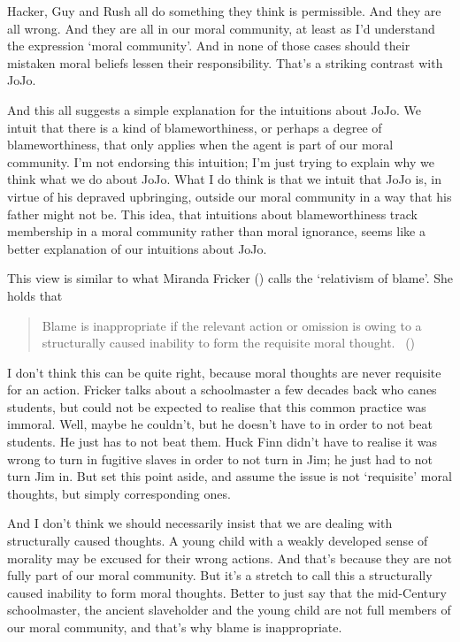 \documentclass[
  10pt,
  letterpaper,
  twoside]{scrbook}
\begin{document}
{Hacker}, {Guy} and {Rush} all do something they think is permissible.
And they are all wrong. And they are all in our moral community, at
least as I'd understand the expression `moral community'. And in none of
those cases should their mistaken moral beliefs lessen their
responsibility. That's a striking contrast with {JoJo}.

And this all suggests a simple explanation for the intuitions about
{JoJo}. We intuit that there is a kind of blameworthiness, or perhaps a
degree of blameworthiness, that only applies when the agent is part of
our moral community. I'm not endorsing this intuition; I'm just trying
to explain why we think what we do about {JoJo}. What I do think is that
we intuit that {JoJo} is, in virtue of his depraved upbringing, outside
our moral community in a way that his father might not be. This idea,
that intuitions about blameworthiness track membership in a moral
community rather than moral ignorance, seems like a better explanation
of our intuitions about {JoJo}.

This view is similar to what Miranda Fricker
() calls the `relativism of blame'.
She holds that

\begin{quote}
Blame is inappropriate if the relevant action or omission is owing to a
structurally caused inability to form the requisite moral thought.
~()
\end{quote}

I don't think this can be quite right, because moral thoughts are never
requisite for an action. Fricker talks about a schoolmaster a few
decades back who canes students, but could not be expected to realise
that this common practice was immoral. Well, maybe he couldn't, but he
doesn't have to in order to not beat students. He just has to not beat
them. {Huck} Finn didn't have to realise it was wrong to turn in
fugitive slaves in order to not turn in Jim; he just had to not turn Jim
in. But set this point aside, and assume the issue is not `requisite'
moral thoughts, but simply corresponding ones.

And I don't think we should necessarily insist that we are dealing with
structurally caused thoughts. A young child with a weakly developed
sense of morality may be excused for their wrong actions. And that's
because they are not fully part of our moral community. But it's a
stretch to call this a structurally caused inability to form moral
thoughts. Better to just say that the mid-Century schoolmaster, the
ancient slaveholder and the young child are not full members of our
moral community, and that's why blame is inappropriate.
\end{document}
